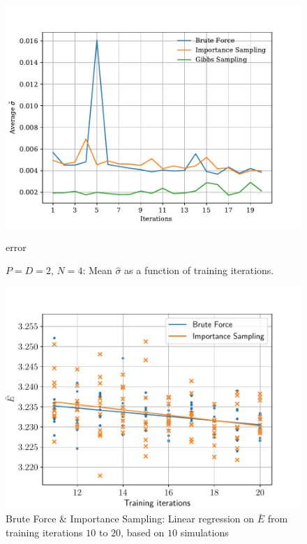 \documentclass[%
oneside,                 %
final,                   %
10pt]{article}
\begin{document}
\begin{appendices}
\begin{figure}[H]
        \centering 
         \includegraphics[scale=0.7]{../Results/sim_12/error_interacting.pdf} 
        \caption{error }
         \caption{$P=D=2$, $N=4$: Mean $\hat \sigma$ as a function of training iterations.}
        \label{fig:interacting_n4_sigma}     
\end{figure}  


\begin{figure}[H]
        \centering 
         \includegraphics[scale=0.7]{../Results/sim_12/regression/Regression_BF_IS.pdf} 
        \caption{Brute Force \& Importance Sampling: Linear regression on $\bar E$ from training iterations $10$ to $20$, based on $10$ simulations  }
        \label{fig:reg_BFIS}   
\end{figure}  



\end{appendices}
\end{document}
